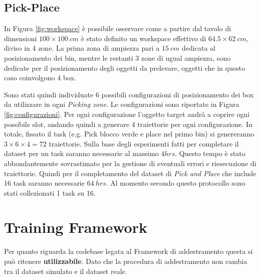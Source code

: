 \subsection{Pick-Place}

In Figura \ref{fig:workspace} è possibile osservare come a partire dal tavolo di dimensioni $100\times100 \ cm$ è stato definito un workspace effettivo di $64.5 \times 62 \ cm$, diviso in 4 zone. La prima zona di ampiezza pari a $15 \ cm$ dedicata al posizionamento dei bin, mentre le restanti 3 zone di ugual ampiezza, sono dedicate per il posizionamento degli oggetti da prelevare, oggetti che in questo caso coinvolgono 4 box.

Sono stati quindi individuate 6 possibili configurazioni di posizionamento dei box da utilizzare in ogni \textit{Picking zone}. Le configurazioni sono riportate in Figura \ref{fig:configurazioni}.
\newline Per ogni configurazione l'oggetto target andrà a coprire ogni possibile slot, andando quindi a generare 4 traiettorie per ogni configurazione.
In totale, fissato il task (e.g. Pick blocco verde e place nel primo bin) si genereranno $3 \times 6 \times 4 = 72$ traiettorie.
\newline Sulla base degli esperimenti fatti per completare il dataset per un task saranno necessarie al massimo $ 4 hrs$. Questo tempo è stato abbondantemente sovrastimato per la gestione di eventuali errori e riesecuzione di traiettorie.
Quindi per il completamento del dataset di \textit{Pick and Place} che include 16 task saranno necessarie $64 \ hrs$.
Al momento secondo questo protocollo sono stati collezionati 1 task su 16.

\section{Training Framework}
Per quanto riguarda la codebase legata al Framework di addestramento questa si può ritenere \textbf{utilizzabile}. Dato che la procedura di addestramento non cambia tra il dataset simulato e il dataset reale.
